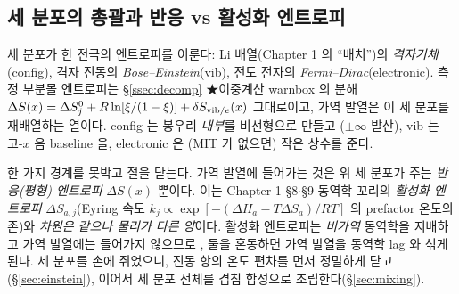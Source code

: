 \subsection{세 분포의 총괄과 반응 vs 활성화 엔트로피}\label{ssec:threedist}
\begin{keybox}
세 분포가 한 전극의 엔트로피를 이룬다: Li 배열(Chapter 1 의 ``배치'')의 \emph{격자기체}(config), 격자 진동의
\emph{Bose--Einstein}(vib), 전도 전자의 \emph{Fermi--Dirac}(electronic). 측정 부분몰 엔트로피는
\S\ref{ssec:decomp} ★이중계산 warnbox 의 분해 $\Delta S(x)=\Delta S^0_j+R\ln[\xi/(1-\xi)]+\delta S_{\mathrm{vib}/e}(x)$
그대로이고, 가역 발열은 이 세 분포를 재배열하는 열이다. config 는 봉우리 \emph{내부}를 비선형으로 만들고
($\pm\infty$ 발산), vib 는 고-$x$ 음 baseline 을, electronic 은 (MIT 가 없으면) 작은 상수를 준다.
\end{keybox}

한 가지 경계를 못박고 절을 닫는다. 가역 발열에 들어가는 것은 위 세 분포가 주는 \emph{반응(평형) 엔트로피}
$\Delta S(x)$ 뿐이다. 이는 Chapter 1 §8$\cdot$§9 동역학 꼬리의 \emph{활성화 엔트로피} $\Delta S_{a,j}$(Eyring
속도 $k_j\propto\exp[-(\Delta H_a-T\Delta S_a)/RT]$ 의 prefactor 온도의존)와 \emph{차원은 같으나 물리가 다른
양}이다. 활성화 엔트로피는 \emph{비가역} 동역학을 지배하고 가역 발열에는 들어가지 않으므로 \cite{msmr_partI},
둘을 혼동하면 가역 발열을 동역학 lag 와 섞게 된다. 세 분포를 손에 쥐었으니, 진동 항의 온도 편차를 먼저
정밀하게 닫고(\S\ref{sec:einstein}), 이어서 세 분포 전체를 겹침 합성으로 조립한다(\S\ref{sec:mixing}).

